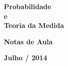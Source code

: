 %
%
%
\begin{titlepage}			%

\begin{center}				%

	{\fontsize{16mm}{11mm}
		\selectfont
		\textbf{Probabilidade} 
		\\[0.3cm]
		\textbf{e}
		\\[0.3cm] 
		\textbf{Teoria da Medida} 
		}

	\vspace{60mm}				%


	{\fontsize{14pt}{14pt}\selectfont
		\textbf{Notas de Aula}
		}
	
	\vspace{7pt}				%


	{\fontsize{14pt}{14pt}\selectfont
		\textbf{Julho / 2014}
		}
	
	\vfill						%


	\vspace{10mm}				%
	\begin{figure}[h]            %
		\centering
	\end{figure} 

\end{center}
\end{titlepage}
